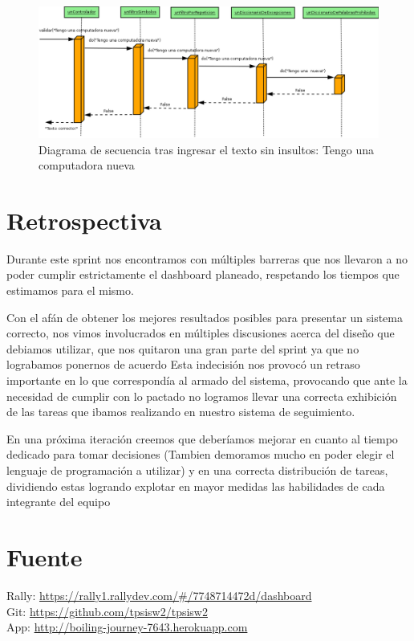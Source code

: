 \begin{figure}[H]
\centering
\includegraphics[scale=0.35]{../../img/computadora.png}
\caption{Diagrama de secuencia tras ingresar el texto sin insultos: Tengo una computadora nueva}
\end{figure}

\section{Retrospectiva}

Durante este sprint nos encontramos con múltiples barreras que nos llevaron a no poder cumplir estrictamente el dashboard planeado, respetando los tiempos que estimamos para el mismo.

Con el afán de obtener los mejores resultados posibles para presentar un sistema correcto, nos vimos involucrados en múltiples discusiones acerca del diseño que debiamos utilizar, que nos quitaron una gran parte del sprint ya que no lograbamos ponernos de acuerdo
Esta indecisión nos provocó un retraso importante en lo que correspondía al armado del sistema, provocando que ante la necesidad de cumplir con lo pactado no logramos llevar una correcta exhibición de las tareas que ibamos realizando en nuestro sistema de seguimiento.

En una próxima iteración creemos que deberíamos mejorar en cuanto al tiempo dedicado para tomar decisiones (Tambien demoramos mucho en poder elegir el lenguaje de programación a utilizar) y en una correcta distribución de tareas, dividiendo estas logrando explotar en mayor medidas las habilidades de cada integrante del equipo

\section{Fuente}

Rally: \href{https://rally1.rallydev.com/#/7748714472d/dashboard}{https://rally1.rallydev.com/#/7748714472d/dashboard}\\
Git: \href{https://github.com/tpsisw2/tpsisw2}{https://github.com/tpsisw2/tpsisw2}\\
App: \href{http://boiling-journey-7643.herokuapp.com}{http://boiling-journey-7643.herokuapp.com}
